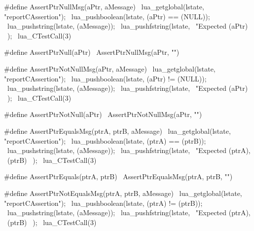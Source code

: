 \startCHeader
#define AssertPtrNullMsg(aPtr, aMessage)     \
  lua_getglobal(lstate, "reportCAssertion"); \
  lua_pushboolean(lstate, (aPtr) == (NULL)); \
  lua_pushstring(lstate, (aMessage));        \
  lua_pushfstring(lstate,                    \
      "Expected %
      (aPtr)                                 \
    );                                       \
  lua_CTestCall(3)

#define AssertPtrNull(aPtr) \
  AssertPtrNullMsg(aPtr, "")
\stopCHeader

\stopTestSuite

\startTestSuite[assertPtrNotNull]

\startCHeader
#define AssertPtrNotNullMsg(aPtr, aMessage)  \
  lua_getglobal(lstate, "reportCAssertion"); \
  lua_pushboolean(lstate, (aPtr) != (NULL)); \
  lua_pushstring(lstate, (aMessage));        \
  lua_pushfstring(lstate,                    \
      "Expected %
      (aPtr)                                 \
    );                                       \
  lua_CTestCall(3)

#define AssertPtrNotNull(aPtr) \
  AssertPtrNotNullMsg(aPtr, "")
\stopCHeader

\stopTestSuite

\startTestSuite[assertPtrEquals]

\startCHeader
#define AssertPtrEqualsMsg(ptrA, ptrB, aMessage) \
  lua_getglobal(lstate, "reportCAssertion");     \
  lua_pushboolean(lstate, (ptrA) == (ptrB));     \
  lua_pushstring(lstate, (aMessage));            \
  lua_pushfstring(lstate,                        \
      "Expected %
      (ptrA),                                    \
      (ptrB)                                     \
    );                                           \
  lua_CTestCall(3)

#define AssertPtrEquals(ptrA, ptrB) \
  AssertPtrEqualsMsg(ptrA, ptrB, "")
\stopCHeader

\stopTestSuite

\startTestSuite[assertPtrNotEquals]

\startCHeader
#define AssertPtrNotEqualsMsg(ptrA, ptrB, aMessage) \
  lua_getglobal(lstate, "reportCAssertion");        \
  lua_pushboolean(lstate, (ptrA) != (ptrB));        \
  lua_pushstring(lstate, (aMessage));               \
  lua_pushfstring(lstate,                           \
      "Expected %
      (ptrA),                                       \
      (ptrB)                                        \
    );                                              \
  lua_CTestCall(3)


